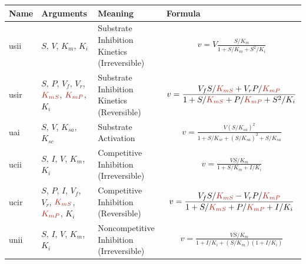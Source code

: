 \documentclass[10pt]{cekarticle}
\newcommand{\changed}[1]{\textcolor{BrickRed}{#1}}
\newenvironment{blockChanged}{\color{BrickRed}}{}
\begin{document}
\addtocounter{table}{-1}
\begin{table}[ht]
\setlength{\abovedisplayskip}{-2pt}
\setlength{\belowdisplayskip}{1pt}
\begin{tabular}{|p{0.5in}|>{\raggedright}m{0.77in}|>{\raggedright}m{1.5in}|m{3in}|}
\hline
\textbf{Name} & \textbf{Arguments} & \textbf{Meaning} &
\textbf{Formula} \\
\hline

usii & $S$, $V$, $K_m$, $K_i$ & Substrate Inhibition Kinetics
(Irreversible) &
\begin{gather*}
v = V \frac{S/K_m}{1 + S/K_m + S^2/K_i}
\end{gather*}
\\ \hline

usir & $S$, $P$, $V_f$, $V_r$, $\changed{K_{mS}}$, $\changed{K_{mP}}$, $K_i$ & Substrate
Inhibition Kinetics (Reversible) &
\begin{gather*}
v = \frac{V_f S/\changed{K_{mS}} + V_r
P/\changed{K_{mP}}}{1 + S/\changed{K_{mS}} + P/\changed{K_{mP}} + S^2/K_i}
\end{gather*}
\\ \hline

uai & $S$, $V$, $K_{sa}$, $K_{sc}$ & Substrate Activation &
\begin{gather*}
v = \frac{V \left( S/K_{sa} \right)^2}{1 + S/K_{sc} + \left( S/K_{sa}\right)^2
  + S/K_{sa}}
\end{gather*}
\\ \hline

ucii & $S$, \changed{$I$}, $V$, $K_m$, $K_i$ & Competitive Inhibition (Irreversible) &
\begin{gather*}
v = \frac{V S/K_m}{1 + S/K_m + I/K_i}
\end{gather*}
\\ \hline

ucir & $S$, $P$, \changed{$I$}, $V_f$, $V_r$, $\changed{K_{mS}}$, $\changed{K_{mP}}$, $K_i$ & Competitive Inhibition
(Reversible) &
\begin{gather*}
v = \frac{V_f S/\changed{K_{mS}} - V_r P/\changed{K_{mP}}}{1 +
  S/\changed{K_{mS}} + P/\changed{K_{mP}} + I/K_i}
\end{gather*}
\\ \hline

unii & $S$, $I$, $V$, $K_m$, $K_i$ & Noncompetitive Inhibition
(Irreversible) &
\begin{blockChanged}
\begin{gather*}
v = \frac{V S/K_m}{1 + I/K_i + \left( S/K_m \right) \left( 1 + I/K_i\right) }
\end{gather*}
\end{blockChanged}
\\ \hline


\end{tabular}
\end{table}
\end{document}
